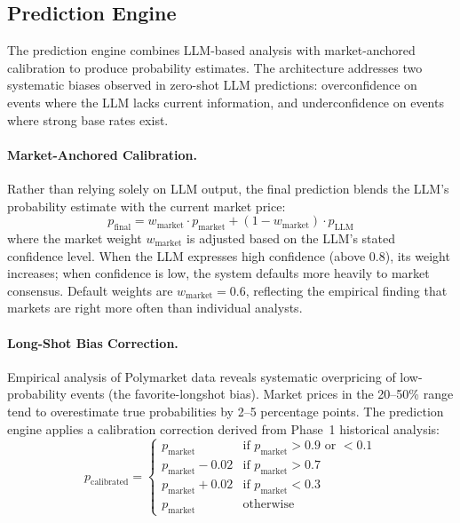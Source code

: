 \subsection{Prediction Engine}
\label{sec:prediction}

The prediction engine combines LLM-based analysis with market-anchored calibration to produce probability estimates. The architecture addresses two systematic biases observed in zero-shot LLM predictions: overconfidence on events where the LLM lacks current information, and underconfidence on events where strong base rates exist.

\paragraph{Market-Anchored Calibration.} Rather than relying solely on LLM output, the final prediction blends the LLM's probability estimate with the current market price:
\begin{equation}
    p_{\text{final}} = w_{\text{market}} \cdot p_{\text{market}} + (1 - w_{\text{market}}) \cdot p_{\text{LLM}}
\end{equation}
where the market weight $w_{\text{market}}$ is adjusted based on the LLM's stated confidence level. When the LLM expresses high confidence (above 0.8), its weight increases; when confidence is low, the system defaults more heavily to market consensus. Default weights are $w_{\text{market}} = 0.6$, reflecting the empirical finding that markets are right more often than individual analysts.

\paragraph{Long-Shot Bias Correction.} Empirical analysis of Polymarket data reveals systematic overpricing of low-probability events (the favorite-longshot bias). Market prices in the 20--50\% range tend to overestimate true probabilities by 2--5 percentage points. The prediction engine applies a calibration correction derived from Phase~1 historical analysis:
\begin{equation}
    p_{\text{calibrated}} = \begin{cases}
        p_{\text{market}} & \text{if } p_{\text{market}} > 0.9 \text{ or } < 0.1 \\
        p_{\text{market}} - 0.02 & \text{if } p_{\text{market}} > 0.7 \\
        p_{\text{market}} + 0.02 & \text{if } p_{\text{market}} < 0.3 \\
        p_{\text{market}} & \text{otherwise}
    \end{cases}
\end{equation}

